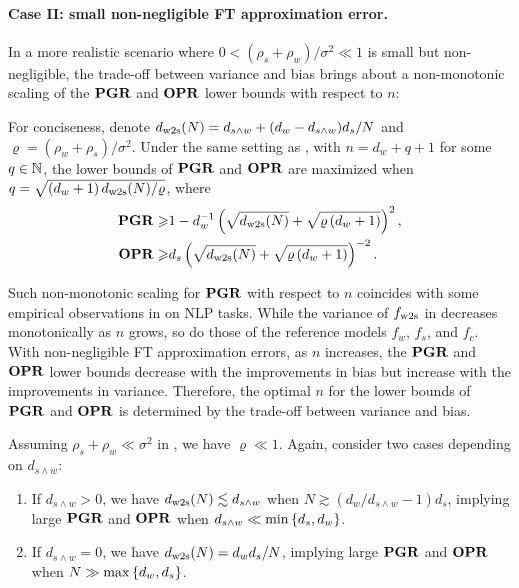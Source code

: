 \paragraph{Case II: small non-negligible FT approximation error.}
In a more realistic scenario where $0 < (\rho_s + \rho_w)/\sigma^2 \ll 1$ is small but non-negligible, the trade-off between variance and bias brings about a non-monotonic scaling of the $\mathbf{PGR}$ and $\mathbf{OPR}$ lower bounds with respect to $n$:
\begin{corollary}\label{cor:non_monotonic_scaling}
    For conciseness, denote $d_{\mathrm{w2s}}(N) = d_{s \wedge w} + (d_w - d_{s \wedge w}) {d_s}/{N}$ and $\varrho = (\rho_w + \rho_s)/\sigma^2$. Under the same setting as , with $n = d_w + q + 1$ for some $q \in \mathbb{N}$, the lower bounds of $\mathbf{PGR}$ and $\mathbf{OPR}$ are maximized when $q = \sqrt{\left(d_w + 1\right) {d_{\mathrm{w2s}}(N)}/{\varrho}}$, where
    \begin{align*}
        \mathbf{PGR} \geqslant &1 - d_w^{-1} \left(\sqrt{d_{\mathrm{w2s}}(N)} + \sqrt{\varrho \left(d_w + 1\right)}\right)^2, \\
        \mathbf{OPR} \geqslant &d_s \left(\sqrt{d_{\mathrm{w2s}}(N)} + \sqrt{\varrho \left(d_w + 1\right)}\right)^{-2}.
    \end{align*}
\end{corollary}
Such non-monotonic scaling for $\mathbf{PGR}$ with respect to $n$ coincides with some empirical observations in \cite{burns2023weak} on NLP tasks.
While the variance of $f_{\mathrm{w2s}}$ in  decreases monotonically as $n$ grows, so do those of the reference models $f_w$, $f_s$, and $f_c$. With non-negligible FT approximation errors, as $n$ increases, the $\mathbf{PGR}$ and $\mathbf{OPR}$ lower bounds decrease with the improvements in bias but increase with the improvements in variance.
Therefore, the optimal $n$ for the lower bounds of $\mathbf{PGR}$ and $\mathbf{OPR}$ is determined by the trade-off between variance and bias.

Assuming $\rho_s + \rho_w \ll \sigma^2$ in , we have $\varrho \ll 1$.
Again, consider two cases depending on $d_{s \wedge w}$:
\begin{enumerate}[label=(\alph*)]
    \item If $d_{s \wedge w} > 0$, we have $d_{\mathrm{w2s}}(N) \lesssim d_{s \wedge w}$ when $N \gtrsim (d_w / d_{s \wedge w} - 1) d_s$, implying large $\mathbf{PGR}$ and $\mathbf{OPR}$ when $d_{s \wedge w} \ll \min\left\{d_s, d_w\right\}$.
    \item If $d_{s \wedge w} = 0$, we have $d_{\mathrm{w2s}}(N) = d_w d_s / N$, implying large $\mathbf{PGR}$ and $\mathbf{OPR}$ when $N \gg \max\left\{d_w, d_s\right\}$.
\end{enumerate}
